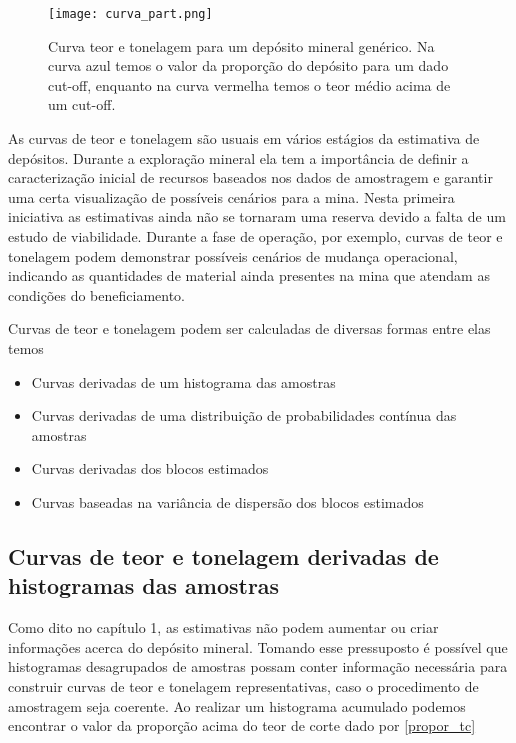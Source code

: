 \begin{figure}[H]
	\centering
	\texttt{[image: curva\_part.png]}	
	\caption{Curva teor e tonelagem para um depósito mineral genérico. Na curva azul temos o valor da proporção do depósito para um dado cut-off, enquanto na curva vermelha temos o teor médio acima de um cut-off.}
	\label{curva_part}
\end{figure}

As curvas de teor e tonelagem são usuais em vários estágios da estimativa de depósitos. Durante a exploração mineral ela tem a importância de definir a caracterização inicial de recursos baseados nos dados de amostragem e garantir uma certa visualização de possíveis cenários para a mina. Nesta primeira iniciativa as estimativas ainda não se tornaram uma reserva devido a falta de um estudo de viabilidade. Durante a fase de operação, por exemplo, curvas de teor e tonelagem podem demonstrar possíveis cenários de mudança operacional, indicando as quantidades de material ainda presentes na mina que atendam as condições do beneficiamento. 


 Curvas de teor e tonelagem podem ser calculadas de diversas formas entre elas temos

\begin{itemize}
	\item Curvas derivadas de um histograma das amostras
	\item Curvas derivadas de uma distribuição de probabilidades contínua das amostras
	\item Curvas derivadas dos blocos estimados
	\item Curvas baseadas na variância de dispersão dos blocos estimados
\end{itemize}

\subsection{Curvas de teor e tonelagem derivadas de histogramas das amostras} \label{teor_t1}

Como dito no capítulo 1, as estimativas não podem aumentar ou criar informações acerca do depósito mineral. Tomando esse pressuposto é possível que histogramas desagrupados de amostras possam conter informação necessária para construir curvas de teor e tonelagem representativas, caso o procedimento de amostragem seja coerente. Ao realizar um histograma acumulado podemos encontrar o valor da proporção acima do teor de corte dado por \eqref{propor_tc}

